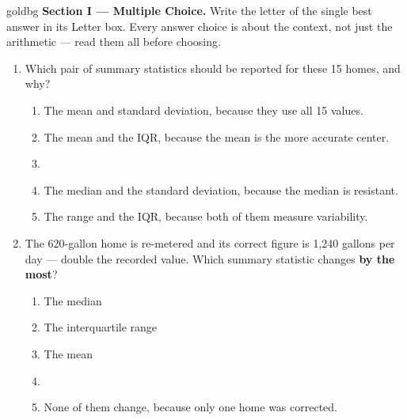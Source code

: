 \documentclass[12pt]{article}
\begin{document}
\vspace{0.10in}

\boxguard[16]
\begin{headlinebox}{goldbg}
\small
\textbf{Section I --- Multiple Choice.} Write the letter of the single best answer in its Letter box. Every answer choice is
about the context, not just the arithmetic --- read them all before choosing.
\end{headlinebox}

\vspace{0.10in}

\begin{enumerate}[leftmargin=1.9em, itemsep=0.10in]

  \item Which pair of summary statistics should be reported for these 15 homes, and why?
        \begin{enumerate}[label=\textbf{(\Alph*)}, leftmargin=2.2em, itemsep=2pt]
          \item The mean and standard deviation, because they use all 15 values.
          \item The mean and the IQR, because the mean is the more accurate center.
          \item {}
          \item The median and the standard deviation, because the median is resistant.
          \item The range and the IQR, because both of them measure variability.
                \hfill{}
        \end{enumerate}

  \boxguard[9]
  \item The 620-gallon home is re-metered and its correct figure is 1{,}240 gallons per day
        --- double the recorded value. Which summary statistic changes \textbf{by the most}?
        \begin{enumerate}[label=\textbf{(\Alph*)}, leftmargin=2.2em, itemsep=2pt]
          \item The median
          \item The interquartile range
          \item The mean
          \item {}
          \item None of them change, because only one home was corrected.
                \hfill{}
        \end{enumerate}


\end{enumerate}
\end{document}
